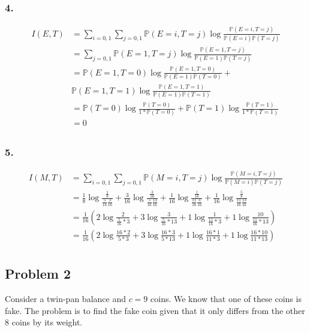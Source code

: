 \documentclass{article}
\newcommand{\1}{\mathbf{1}}
\renewcommand{\P}{\mathbb{P}}
\begin{document}
\subsubsection*{4.}
\begin{align*}
  I(E, T)
   & = \sum_{i=0, 1}\sum_{j=0,1} \P(E = i, T = j) \log \frac{\P(E = i, T = j)}{\P(E = i) \P(T = j)}    \\
   & = \sum_{j=0,1} \P(E = 1, T = j) \log \frac{\P(E = 1, T = j)}{\P(E = 1) \P(T = j)}                 \\
   & = \P(E = 1, T = 0) \log \frac{\P(E = 1, T = 0)}{\P(E = 1) \P(T = 0)} +                            \\
   & \P(E = 1, T = 1) \log \frac{\P(E = 1, T = 1)}{\P(E = 1) \P(T = 1)}                                \\
   & = \P(T = 0) \log \frac{\P(T = 0)}{1 * \P(T = 0)} + \P(T = 1) \log \frac{\P(T = 1)}{1 * \P(T = 1)} \\
   & = 0                                                                                               \\
\end{align*}

\subsubsection*{5.}
\begin{align*}
  I(M, T)
   & = \sum_{i=0, 1}\sum_{j=0,1} \P(M = i, T = j) \log \frac{\P(M = i, T = j)}{\P(M = i) \P(T = j)} \\
   & =
  \frac{1}{8} \log \frac{\frac{1}{8}}{\frac{5}{16}\frac{3}{16}} +
  \frac{3}{16} \log \frac{\frac{3}{16}}{\frac{5}{16}\frac{13}{16}} +
  \frac{1}{16} \log \frac{\frac{1}{16}}{\frac{11}{16}\frac{3}{16}} +
  \frac{1}{16} \log \frac{\frac{5}{8}}{\frac{11}{16}\frac{13}{16}}
  \\
   & =
  \frac{1}{16} \left(
  2 \log \frac{2}{\frac{5}{16} * 3} +
  3 \log \frac{3}{\frac{5}{16} * 13} +
  1 \log \frac{1}{\frac{11}{16} * 3} +
  1 \log \frac{10}{\frac{11}{16} * 13}
  \right)
  \\
   & =
  \frac{1}{16} \left(
  2 \log \frac{16*2}{5 * 3} +
  3 \log \frac{16*3}{5 * 13} +
  1 \log \frac{16*1}{11 * 3} +
  1 \log \frac{16*10}{11 * 13}
  \right)
  \\
\end{align*}


\subsection{Problem 2}
Consider a twin-pan balance and $c = 9$ coins. We know that one of these coins is fake. The problem is to find the fake coin given that it only differs from the other 8 coins by its weight.
\end{document}
